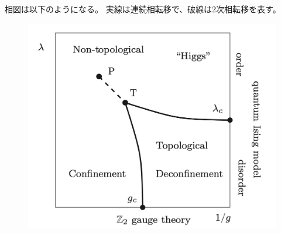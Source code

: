 \documentclass[\main/main.tex]{subfiles}
\begin{document}
\begin{frame}{\currentname}
    相図は以下のようになる。
    実線は連続相転移で、破線は2次相転移を表す。
    \begin{figure}[H]
        \centering
        \includegraphics[width=0.7\hsize]{Z2gaugematter.png}
    \end{figure}
\end{frame}
\end{document}
